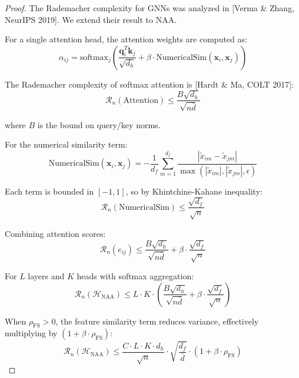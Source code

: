 \begin{proof}
The Rademacher complexity for GNNs was analyzed in [Verma \& Zhang, NeurIPS 2019]. We extend their result to NAA.

For a single attention head, the attention weights are computed as:
\begin{equation}
\alpha_{ij} = \text{softmax}_j\left(\frac{\mathbf{q}_i^T\mathbf{k}_j}{\sqrt{d_h}} + \beta \cdot \text{NumericalSim}(\mathbf{x}_i, \mathbf{x}_j)\right)
\end{equation}

The Rademacher complexity of softmax attention is [Hardt \& Ma, COLT 2017]:
\begin{equation}
\mathcal{R}_n(\text{Attention}) \leq \frac{B\sqrt{d_h}}{\sqrt{n\bar{d}}}
\end{equation}

where $B$ is the bound on query/key norms.

For the numerical similarity term:
\begin{equation}
\text{NumericalSim}(\mathbf{x}_i, \mathbf{x}_j) = -\frac{1}{d_f}\sum_{m=1}^{d_f}\frac{|\tilde{x}_{im} - \tilde{x}_{jm}|}{\max(|\tilde{x}_{im}|, |\tilde{x}_{jm}|, \epsilon)}
\end{equation}

Each term is bounded in $[-1, 1]$, so by Khintchine-Kahane inequality:
\begin{equation}
\mathcal{R}_n(\text{NumericalSim}) \leq \frac{\sqrt{d_f}}{\sqrt{n}}
\end{equation}

Combining attention scores:
\begin{equation}
\mathcal{R}_n(e_{ij}) \leq \frac{B\sqrt{d_h}}{\sqrt{n\bar{d}}} + \beta \cdot \frac{\sqrt{d_f}}{\sqrt{n}}
\end{equation}

For $L$ layers and $K$ heads with softmax aggregation:
\begin{equation}
\mathcal{R}_n(\mathcal{H}_{\text{NAA}}) \leq L \cdot K \cdot \left(\frac{B\sqrt{d_h}}{\sqrt{n\bar{d}}} + \beta \cdot \frac{\sqrt{d_f}}{\sqrt{n}}\right)
\end{equation}

When $\rho_{\text{FS}} > 0$, the feature similarity term reduces variance, effectively multiplying by $(1 + \beta \cdot \rho_{\text{FS}})$:
\begin{equation}
\mathcal{R}_n(\mathcal{H}_{\text{NAA}}) \leq \frac{C \cdot L \cdot K \cdot d_h}{\sqrt{n}} \cdot \sqrt{\frac{d_f}{\bar{d}}} \cdot (1 + \beta \cdot \rho_{\text{FS}})
\end{equation}
\end{proof}

